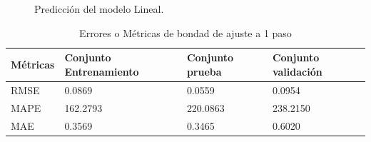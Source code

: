 \documentclass[12pt]{article}
\begin{document}
\begin{figure}
		\centering
		\captionsetup{justification=centering}
		\\
		\\
		\caption{Predicción del modelo Lineal.}
		\label{f_G123}
\end{figure}

\begin{table}[h!]
  \centering
  \caption{Errores o Métricas de bondad de ajuste a 1 paso}
\begin{tabular}{|l|l|l|l|}
	\hline
	Métricas & Conjunto Entrenamiento & Conjunto prueba & Conjunto validación \\ \hline
	RMSE     & 0.0869                 & 0.0559          & 0.0954              \\ \hline
	MAPE     & 162.2793               & 220.0863        & 238.2150            \\ \hline
	MAE      & 0.3569                 & 0.3465          & 0.6020              \\ \hline
\end{tabular}
  \label{t_NoLinealp1}%
\end{table}%
\end{document}
